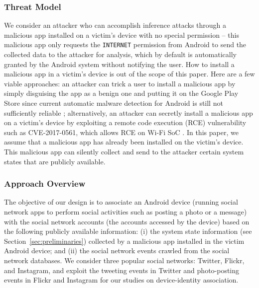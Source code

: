 \documentclass[letterpaper,12pt]{article}
\begin{document}
\subsubsection{Threat Model}\label{sec:dssnthreat}
We consider an attacker who can accomplish inference attacks through a malicious app installed on a victim's device with no special permission -- this malicious app only requests the \texttt{INTERNET} permission from Android to send the collected data to the attacker for analysis, which by default is automatically granted by the Android system without notifying the user. How to install a malicious app in a victim's device is out of the scope of this paper. Here are a few viable approaches: an attacker can trick a user to install a malicious app by simply disguising the app as a benign one and putting it on the Google Play Store since current automatic malware detection for Android is still not sufficiently reliable \cite{googleplaymalware}; alternatively, an attacker can secretly install a malicious app on a victim's device by exploiting a remote code execution (RCE) vulnerability such as CVE-2017-0561, which allows RCE on Wi-Fi SoC \cite{wifirce}. In this paper, we assume that a malicious app has already been installed on the victim's device. This malicious app can silently collect and send to the attacker certain system states that are publicly available.

\subsubsection{Approach Overview}\label{sec:dssnapproachoverview}
The objective of our design is to associate an Android device (running social network apps to perform social activities such as posting a photo or a message) with the social network accounts (the accounts accessed by the device) based on the following publicly available information: (i) the system state information (see Section~\ref{sec:preliminaries}) collected by a malicious app installed in the victim Android device; and (ii) the social network events crawled from the social network databases. We consider three popular social networks: Twitter, Flickr, and Instagram, and exploit the tweeting events in Twitter and photo-posting events in Flickr and Instagram for our studies on device-identity association. 
\end{document}
